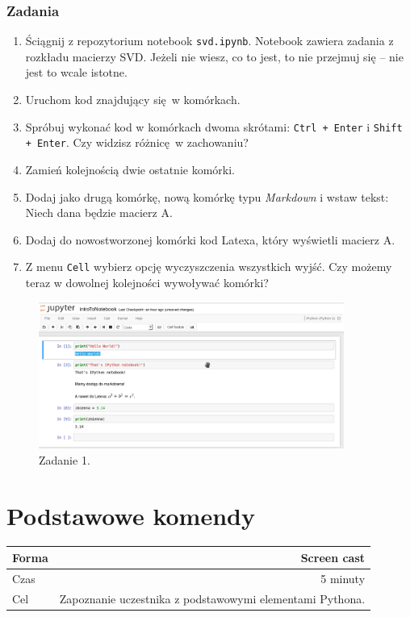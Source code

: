 \documentclass{mwart}
\begin{document}
\subsubsection{Zadania}
\begin{enumerate}
  \item Ściągnij z repozytorium notebook \texttt{svd.ipynb}. Notebook zawiera zadania z
    rozkładu macierzy SVD. Jeżeli nie wiesz, co to jest, to nie przejmuj się
    -- nie jest to wcale istotne.
  \item Uruchom kod znajdujący się w komórkach.
  \item Spróbuj wykonać kod w komórkach dwoma skrótami: \texttt{Ctrl + Enter} i
    \texttt{Shift + Enter}. Czy widzisz różnicę w zachowaniu?
  \item Zamień kolejnością dwie ostatnie komórki.
  \item Dodaj jako drugą komórkę, nową komórkę typu \emph{Markdown} i wstaw tekst:
    Niech dana będzie macierz A.
  \item Dodaj do nowostworzonej komórki kod Latexa, który wyświetli macierz A.
  \item Z menu \texttt{Cell} wybierz opcję wyczyszczenia wszystkich wyjść. Czy możemy
    teraz w dowolnej kolejności wywoływać komórki?
\end{enumerate}

\begin{center}
  \begin{figure}
    \includegraphics[width=10cm]{zad1}
    \caption{Zadanie 1.}
  \end{figure}
\end{center}

\section{Podstawowe komendy}

\begin{center}
  \begin{tabular}{lr}
    \toprule
    Forma & Screen cast \\
    \midrule
    Czas & 5 minuty \\
    Cel & Zapoznanie uczestnika z podstawowymi elementami Pythona. \\
    \bottomrule
  \end{tabular}
\end{center}
\end{document}
